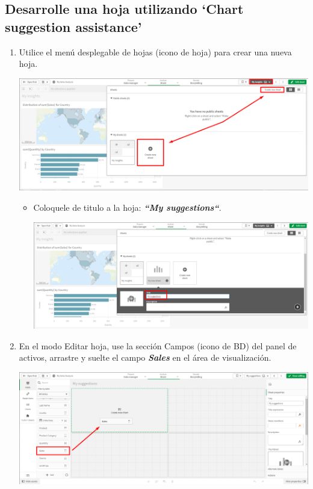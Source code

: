 \documentclass[12pt,letterpaper]{article}
\newcommand\tab[1][1cm]{\hspace*{#1}}
\begin{document}
    \subsection{Desarrolle una hoja utilizando ‘Chart suggestion assistance’}
    \begin{enumerate}[\tab 1.]
        \item Utilice el menú desplegable de hojas (icono de hoja) para crear una nueva hoja.
        \begin{center}
            \includegraphics[width=13cm]{./img/img16.png}
        \end{center}
        \begin{itemize}
            \item Coloquele de titulo a la hoja: \textit{\textbf{“My suggestions“}}.
            \begin{center}
                \includegraphics[width=13cm]{./img/img16.1.png}
            \end{center}
        \end{itemize}
        \item En el modo Editar hoja, use la sección Campos (icono de BD) del panel de activos, arrastre y suelte el campo \textit{\textbf{Sales}} en el área de visualización.
        \begin{center}
            \includegraphics[width=13cm]{./img/img17.png}

\end{center}
\end{enumerate}
\end{document}

